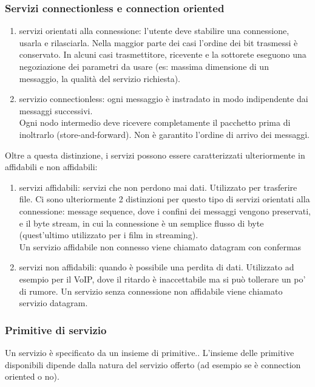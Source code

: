 \documentclass{article}
\begin{document}
			\subsubsection{Servizi connectionless e connection oriented}
				\begin{enumerate}
					\item servizi orientati alla connessione: l'utente deve stabilire una connessione, usarla e rilasciarla. Nella maggior parte dei casi l'ordine dei bit trasmessi è conservato. In alcuni casi trasmettitore, ricevente e la sottorete eseguono una negoziazione dei parametri da usare (es: massima dimensione di un messaggio, la qualità del servizio richiesta). 
					\item servizio connectionless: ogni messaggio è instradato in modo indipendente dai messaggi successivi. \\
					Ogni nodo intermedio deve ricevere completamente il pacchetto prima di inoltrarlo (store-and-forward).
					Non è garantito l'ordine di arrivo dei messaggi.
				\end{enumerate}
				Oltre a questa distinzione, i servizi possono essere caratterizzati ulteriormente in affidabili e non affidabili:
				\begin{enumerate}
					\item servizi affidabili: servizi che non perdono mai dati. Utilizzato per trasferire file. Ci sono ulteriormente 2 distinzioni per questo tipo di servizi orientati alla connessione: message sequence, dove i confini dei messaggi vengono preservati, e il byte stream, in cui la connessione è un semplice flusso di byte (quest'ultimo utilizzato per i film in streaming). \\
				Un servizio affidabile non connesso viene chiamato datagram con confermas
				\item servizi non affidabili: quando è possibile una perdita di dati. Utilizzato ad esempio per il VoIP, dove il ritardo è inaccettabile ma si può tollerare un po' di rumore.
				Un servizio senza connessione non affidabile viene chiamato servizio datagram.
				\end{enumerate}
			\subsubsection{Primitive di servizio}
			Un servizio è specificato da un insieme di primitive.. L'insieme delle primitive disponibili dipende dalla natura del servizio offerto (ad esempio se è connection oriented o no). 
			
\end{document}
